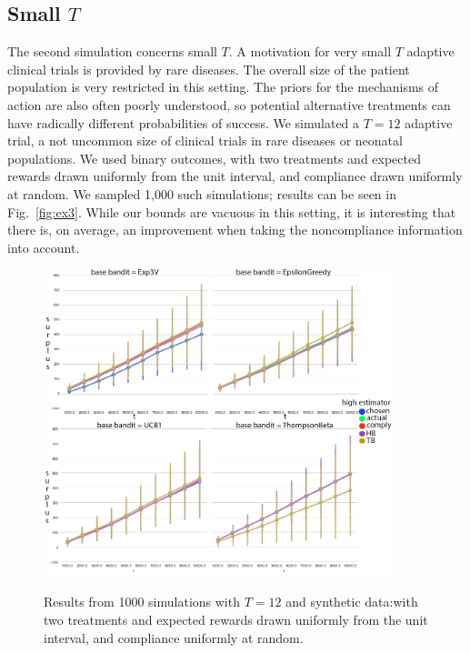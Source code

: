 \subsection{Small $T$}

The second simulation concerns small $T$. A motivation for very small $T$ adaptive clinical trials is provided by rare diseases. The overall size of the patient population is very restricted in this setting.
The priors for the mechanisms of action are also often poorly understood, so potential alternative treatments can have radically different probabilities of success. 
We simulated a $T=12$ adaptive trial, a not uncommon size of clinical trials in rare diseases or neonatal populations. We used binary outcomes, with two treatments and expected rewards drawn uniformly from the unit interval, and compliance drawn uniformly at random. We sampled 1,000 such simulations; results can be seen in Fig.~\eqref{fig:ex3}.
While our bounds are vacuous in this setting, it is interesting that there is, on average, an improvement when taking the noncompliance information into account.


\begin{figure}[t]
	\centering	
	\includegraphics[width=0.9\textwidth]{bandit/figs/ex3.png}\hspace{1cm}
	\label{fig:ex3}
	\caption{Results from 1000 simulations with $T=12$ and synthetic data:with two treatments and expected rewards drawn uniformly from the unit interval, and compliance uniformly at random.}
\end{figure}





